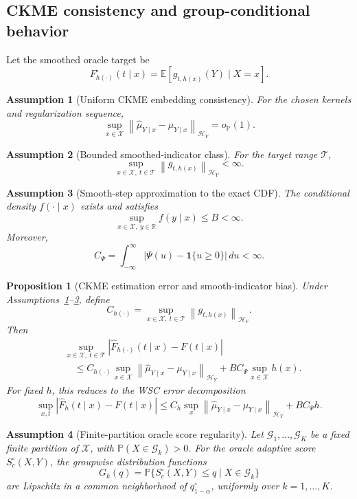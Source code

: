 \documentclass[11pt]{article}
\newtheorem{assumption}{Assumption}
\newtheorem{proposition}{Proposition}
\newcommand{\Xcal}{\mathcal X}
\newcommand{\Hcal}{\mathcal H}
\newcommand{\Gcal}{\mathcal G}
\newcommand{\Tcal}{\mathcal T}
\newcommand{\Pp}{\mathbb P}
\newcommand{\E}{\mathbb E}
\newcommand{\R}{\mathbb R}
\newcommand{\ind}{\mathbf 1}
\newcommand{\norm}[1]{\left\lVert #1 \right\rVert}
\newcommand{\abs}[1]{\left\lvert #1 \right\rvert}
\newcommand{\op}{o_{\mathbb P}}
\begin{document}
\subsection{CKME consistency and group-conditional behavior}

Let the smoothed oracle target be
\[
  F_{h(\cdot)}^\circ(t\mid x)=
  \E[g_{t,h(x)}(Y)\mid X=x].
\]

\begin{assumption}[Uniform CKME embedding consistency]
\label{ass:ckme}
For the chosen kernels and regularization sequence,
\[
  \sup_{x\in\Xcal}
  \norm{\widehat\mu_{Y\mid x}-\mu_{Y\mid x}}_{\Hcal_Y}
  =\op(1).
\]
\end{assumption}

\begin{assumption}[Bounded smoothed-indicator class]
\label{ass:g}
For the target range \(\Tcal\),
\[
  \sup_{x\in\Xcal,\ t\in\Tcal}
  \norm{g_{t,h(x)}}_{\Hcal_Y}<\infty.
\]
\end{assumption}

\begin{assumption}[Smooth-step approximation to the exact CDF]
\label{ass:smoothing-bias}
The conditional density \(f(\cdot\mid x)\) exists and satisfies
\[
  \sup_{x\in\Xcal,\ y\in\R}f(y\mid x)\le B<\infty.
\]
Moreover,
\[
  C_\Psi
  =
  \int_{-\infty}^{\infty}
  \abs{\Psi(u)-\ind\{u\ge0\}}\,du
  <\infty.
\]
\end{assumption}

\begin{proposition}[CKME estimation error and smooth-indicator bias]
\label{prop:ckme-exact-cdf}
Under Assumptions~\ref{ass:ckme}--\ref{ass:smoothing-bias}, define
\[
  C_{h(\cdot)}
  =
  \sup_{x\in\Xcal,\ t\in\Tcal}
  \norm{g_{t,h(x)}}_{\Hcal_Y}.
\]
Then
\[
\begin{aligned}
  &\sup_{x\in\Xcal,\ t\in\Tcal}
  \abs{\widehat F_{h(\cdot)}(t\mid x)-F(t\mid x)}\\
  &\quad\le
  C_{h(\cdot)}
  \sup_{x\in\Xcal}
  \norm{\widehat\mu_{Y\mid x}-\mu_{Y\mid x}}_{\Hcal_Y}
  +
  B C_\Psi\sup_{x\in\Xcal}h(x).
\end{aligned}
\]
For fixed \(h\), this reduces to the WSC error decomposition
\[
  \sup_{x,t}\abs{\widehat F_h(t\mid x)-F(t\mid x)}
  \le
  C_h\sup_x
  \norm{\widehat\mu_{Y\mid x}-\mu_{Y\mid x}}_{\Hcal_Y}
  +
  B C_\Psi h.
\]
\end{proposition}

\begin{assumption}[Finite-partition oracle score regularity]
\label{ass:group}
Let \(\Gcal_1,\ldots,\Gcal_K\) be a fixed finite partition of \(\Xcal\), with \(\Pp(X\in\Gcal_k)>0\). For the oracle adaptive score \(S_c^\circ(X,Y)\), the groupwise distribution functions
\[
  G_k(q)=\Pp\{S_c^\circ(X,Y)\le q\mid X\in\Gcal_k\}
\]
are Lipschitz in a common neighborhood of \(q^\circ_{1-\alpha}\), uniformly over \(k=1,\ldots,K\).
\end{assumption}
\end{document}
